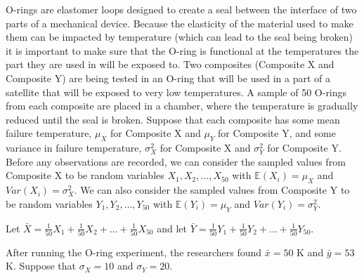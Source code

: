 \documentclass[addpoints]{examsetup}
\begin{document}
\begin{questions}
\newpage

\question
O-rings are elastomer loops designed to create a seal between the interface of two parts of a mechanical device.
Because the elasticity of the material used to make them can be impacted by temperature (which can lead to the seal being broken) it is important to make sure that the O-ring is functional at the temperatures the part they are used in will be exposed to.
Two composites (Composite X and Composite Y) are being tested in an O-ring that will be used in a part of a satellite that will be exposed to very low temperatures.
A sample of 50 O-rings from each composite are placed in a chamber, where the temperature is gradually reduced until the seal is broken.
Suppose that each composite has some mean failure temperature, $\mu_X$ for Composite X and $\mu_Y$ for Composite Y, and some variance in failure temperature, 
$\sigma_X^2$ for Composite X and $\sigma_Y^2$ for Composite Y. 
Before any observations are recorded, we can consider the sampled values from Composite X to be random variables $X_1, X_2, \ldots, X_{50}$ with $\mathbb{E}(X_i) = \mu_X$ and $Var(X_i) = \sigma_X^2$.
We can also consider the sampled values from Composite Y to be random variables $Y_1, Y_2, \ldots, Y_{50}$ with $\mathbb{E}(Y_i) = \mu_Y$ and $Var(Y_i) = \sigma_Y^2$.

Let $\bar{X} = \frac{1}{50} X_1 + \frac{1}{50} X_2 + \ldots + \frac{1}{50} X_{50}$ and let $\bar{Y} = \frac{1}{50} Y_1 + \frac{1}{50} Y_2 + \ldots + \frac{1}{50} Y_{50}$.




   After running the O-ring experiment, the researchers found $\bar{x} = 50$ K and $\bar{y} = 53$ K. 
   Suppose that $\sigma_X = 10$ and $\sigma_Y = 20$.
\end{questions}
\end{document}
